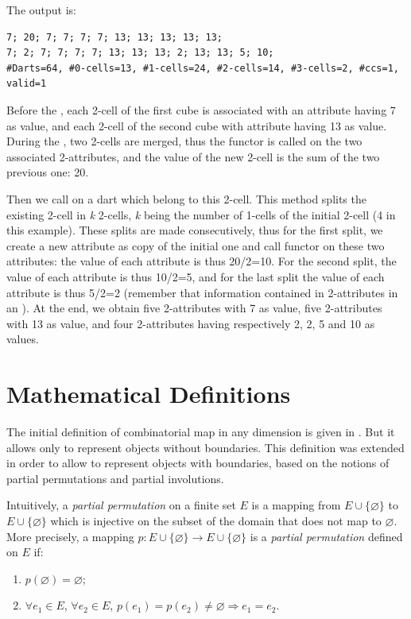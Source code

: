 
The output is:
\begin{verbatim}
7; 20; 7; 7; 7; 7; 13; 13; 13; 13; 13; 
7; 2; 7; 7; 7; 7; 13; 13; 13; 2; 13; 13; 5; 10; 
#Darts=64, #0-cells=13, #1-cells=24, #2-cells=14, #3-cells=2, #ccs=1, valid=1
\end{verbatim}

Before the , each 2-cell of the first cube is
associated with an attribute having 7 as value, and each 2-cell of the
second cube with attribute having 13 as value. During the
, two 2-cells are merged, thus the functor
 is called on the two associated 2-attributes, and
the value of the new 2-cell is the sum of the two previous one: 20.

Then we call  on a dart which
belong to this 2-cell. This method splits the existing 2-cell in \emph{k}
2-cells, \emph{k} being the number of 1-cells of the initial 2-cell (4 in
this example). These splits are made consecutively, thus for the first
split, we create a new attribute as copy of the initial one and call
functor  on these two attributes: the value
of each attribute is thus 20/2=10. For the second split, the value of
each attribute is thus 10/2=5, and for the last split the value of
each attribute is thus 5/2=2 (remember that information contained in
2-attributes in an ).  At the end, we obtain five
2-attributes with 7 as value, five 2-attributes with 13 as value, and
four 2-attributes having respectively 2, 2, 5 and 10 as values.

\section{Mathematical Definitions}\label{sec_definition}
The initial definition of combinatorial map in any dimension is given
in \cite{cgal:l-tmbrc-91,l-ndgcm-94}. But it allows only to represent
objects without boundaries. This definition was extended
\cite{cgal:pabl-cco-07,cgal:d-ccccg-10} in order to allow to represent 
objects with boundaries, based on the notions of partial permutations 
and partial involutions.

Intuitively, a \emph{partial permutation} on a finite set $E$ is a
mapping from $E\cup\{\varnothing\}$ to $E\cup\{\varnothing\}$ which is
injective on the subset of the domain that does not map to
$\varnothing$.  More precisely, a mapping $p:E \cup \{\varnothing\}
\rightarrow E \cup \{\varnothing\}$ is a \emph{partial permutation}
defined on $E$ if:
\begin{enumerate}
\item $p(\varnothing)=\varnothing$;
\item $\forall e_1 \in E$, $\forall e_2 \in E$,
  $p(e_1)=p(e_2)\neq \varnothing \Rightarrow e_1=e_2$.
\end{enumerate}

